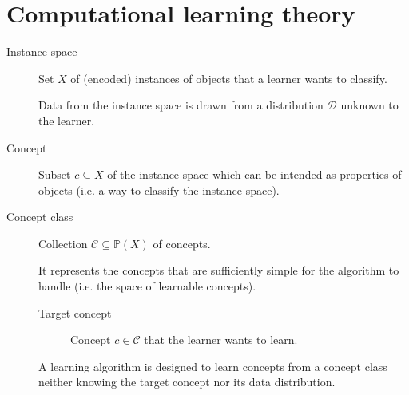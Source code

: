 \chapter{Computational learning theory}

\begin{description}
    \item[Instance space] 
        Set $X$ of (encoded) instances of objects that a learner wants to classify.

        Data from the instance space is drawn from a distribution $\mathcal{D}$ unknown to the learner.

    \item[Concept] 
        Subset $c \subseteq X$ of the instance space which can be intended as properties of objects (i.e. a way to classify the instance space).

    \item[Concept class] 
        Collection $\mathcal{C} \subseteq \mathbb{P}(X)$ of concepts.

        It represents the concepts that are sufficiently simple for the algorithm to handle (i.e. the space of learnable concepts).

        \begin{description}
            \item[Target concept]
                Concept $c \in \mathcal{C}$ that the learner wants to learn.
        \end{description}

        \begin{remark}
            A learning algorithm is designed to learn concepts from a concept class
            neither knowing the target concept nor its data distribution.
        \end{remark}


\end{description}
